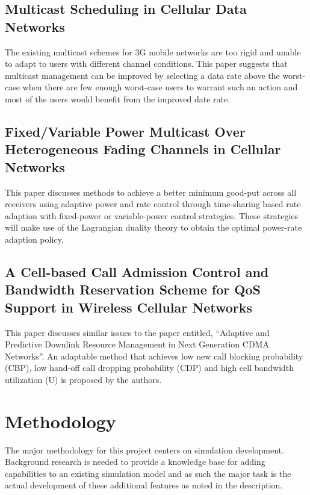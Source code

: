 \documentclass{article}
\begin{document}
\subsection{Multicast Scheduling in Cellular Data Networks}

The existing multicast schemes for 3G mobile networks are too rigid
and unable to adapt to users with different channel conditions. This
paper suggests that multicast management can be improved by selecting
a data rate above the worst-case when there are few enough worst-case
users to warrant such an action and most of the users would benefit
from the improved date rate.~\cite{won2007multicast}

\subsection{Fixed/Variable Power Multicast Over Heterogeneous Fading
  Channels in Cellular Networks}

This paper discusses methods to achieve a better minimum good-put
across all receivers using adaptive power and rate control through
time-sharing based rate adaption with fixed-power or variable-power
control strategies. These strategies will make use of the Lagrangian
duality theory to obtain the optimal power-rate adaption
policy.~\cite{du-fixed}

\subsection{A Cell-based Call Admission Control and Bandwidth
  Reservation Scheme for QoS Support in Wireless Cellular Networks}

This paper discusses similar issues to the paper entitled, “Adaptive
and Predictive Downlink Resource Management in Next Generation CDMA
Networks”. An adaptable method that achieves low new call blocking
probability (CBP), low hand-off call dropping probability (CDP) and
high cell bandwidth utilization (U) is proposed by the
authors.~\cite{liu2005}

\section{Methodology}

The major methodology for this project centers on simulation
development. Background research is needed to provide a knowledge base
for adding capabilities to an existing simulation model and as such
the major task is the actual development of these additional features
as noted in the description.
\end{document}
